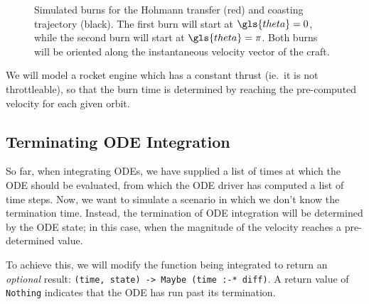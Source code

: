 \documentclass[12pt,openany]{book}
\newcommand{\code}[1]{\texttt{#1}}      %
\begin{document}
\begin{figure}[htbp]
  \centering
  \caption{Simulated burns for the Hohmann transfer (red) and coasting trajectory (black). The first burn will start at \(\gls{theta}=0\), while the second burn will start at \(\gls{theta}=\pi\). Both burns will be oriented along the instantaneous velocity vector of the craft.}
  \label{fig:hohmann-simulation}
\end{figure}

We will model a rocket engine which has a constant thrust (ie.\ it is not throttleable), so that the burn time is determined by reaching the pre-computed velocity for each given orbit.

\subsection{Terminating ODE Integration}

So far, when integrating ODEs, we have supplied a list of times at which the ODE should be evaluated, from which the ODE driver has computed a list of time steps. Now, we want to simulate a scenario in which we don't know the termination time. Instead, the termination of ODE integration will be determined by the ODE state; in this case, when the magnitude of the velocity reaches a pre-determined value.

To achieve this, we will modify the function being integrated to return an \emph{optional} result: \code{(time, state) -> Maybe (time :-* diff)}. A return value of \code{Nothing} indicates that the ODE has run past its termination.
\end{document}
